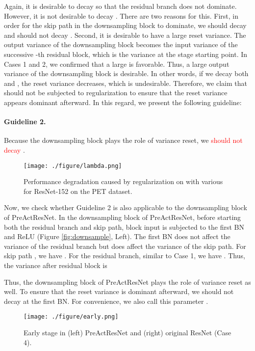 \documentclass{article}
\begin{document}
Again, it is desirable to decay  so that the residual branch does not dominate. However, it is not desirable to decay . There are two reasons for this. First, in order for the skip path in the downsampling block to dominate, we should decay  and should not decay . Second, it is desirable to have a large reset variance. The output variance of the downsampling block becomes the input variance of the successive -th residual block, which is the variance at the stage starting point. In Cases 1 and 2, we confirmed that a large  is favorable. Thus, a large output variance of the downsampling block is desirable. In other words, if we decay both  and , the reset variance decreases, which is undesirable. Therefore, we claim that  should not be subjected to  regularization to ensure that the reset variance appears dominant afterward. In this regard, we present the following guideline:
\paragraph{Guideline 2.}Because the downsampling block plays the role of variance reset, we \textcolor{red}{should not decay} .

\begin{wrapfigure}{r}{0.26\textwidth}
    \centering
\texttt{[image: ./figure/lambda.png]}
    \caption{Performance degradation caused by  regularization on  with various  for ResNet-152 on the PET dataset.}
    \label{fig:lambda}
\end{wrapfigure}
Now, we check whether Guideline 2 is also applicable to the downsampling block of PreActResNet. In the downsampling block of PreActResNet, before starting both the residual branch and skip path, block input  is subjected to the first BN and ReLU (Figure \ref{fig:downsample}, Left). The first BN does not affect the variance of the residual branch but does affect the variance of the skip path. For skip path , we have . For the residual branch, similar to Case 1, we have . Thus, the variance after residual block is


Thus, the downsampling block of PreActResNet plays the role of variance reset as well. To ensure that the reset variance is dominant afterward, we should not decay  at the first BN. For convenience, we also call this parameter .

\begin{figure}[t!]
	\centering
\texttt{[image: ./figure/early.png]}
    \caption{Early stage in (left) PreActResNet and (right) original ResNet (Case 4).}
	\label{fig:early}
\end{figure}
\end{document}
